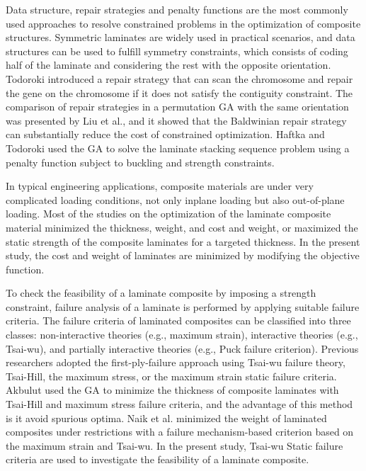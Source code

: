 \documentclass[Afour,sagev,times]{sagej}
\begin{document}
Data structure, repair strategies and penalty functions\cite{le1995improved} are the most commonly used
approaches to resolve constrained problems in the optimization of composite structures. Symmetric
laminates are widely used in practical scenarios, and data structures can be used to fulfill symmetry
constraints, which consists of coding half of the laminate and considering the rest with the
opposite orientation. Todoroki\cite{todoroki1998stacking} introduced a repair strategy that can scan the chromosome and
repair the gene on the chromosome if it does not satisfy the contiguity constraint. The comparison of
repair strategies in a permutation GA with the same orientation was presented by Liu et al.\cite{liu2000permutation}, and it
showed that the Baldwinian repair strategy can substantially reduce the cost of constrained optimization.
Haftka and Todoroki\cite{riche1993optimization} used the GA to solve the laminate stacking sequence problem using a penalty function subject to
buckling and strength constraints.

In typical engineering applications, composite materials are under very complicated loading
conditions, not only inplane loading but also out-of-plane loading. Most of the studies on the
optimization of the laminate composite material minimized the
thickness\cite{abu1998optimum,walker2003technique},
weight\cite{fang1993design,deka2005multiobjective,park2008improved}, and cost and
weight\cite{deka2005multiobjective,omkar2008artificial}, or maximized the static strength of
the composite laminates for a targeted
thickness\cite{walker2003technique,lin2004stacking,kim2007development,gholami2020multi}. 
In the present study,
the cost and weight of laminates are minimized by modifying the objective function.

To check the feasibility of a laminate composite by imposing a strength constraint, failure
analysis of a laminate is performed by applying suitable failure criteria. The failure criteria of
laminated composites can be classified into three classes: non-interactive theories (e.g., maximum
strain), interactive theories (e.g., Tsai-wu), and partially interactive theories (e.g., Puck failure
criterion). Previous researchers adopted the first-ply-failure approach using Tsai-wu
failure
theory\cite{massard1984computer,reddy1987first,fang1993design,soeiro1994multilevel,pelletier2006multi,jadhav2007parametric,omkar2008artificial,choudhury2019failure},
Tsai-Hill\cite{martin1987optimum,soares1995discrete}, the maximum stress\cite{watkins1987multicriteria}, or the maximum strain\cite{watkins1987multicriteria}
static failure criteria. Akbulut\cite{akbulut2008optimum} used the GA to minimize the thickness of composite laminates with
Tsai-Hill and maximum stress failure criteria, and the advantage of this method is it avoid spurious
optima. Naik et al.\cite{naik2008design}
minimized the weight of laminated composites under restrictions with a
failure mechanism-based criterion based on the maximum strain and Tsai-wu. In the present study, Tsai-wu
Static failure criteria are used to investigate the feasibility of a laminate composite.
\end{document}
